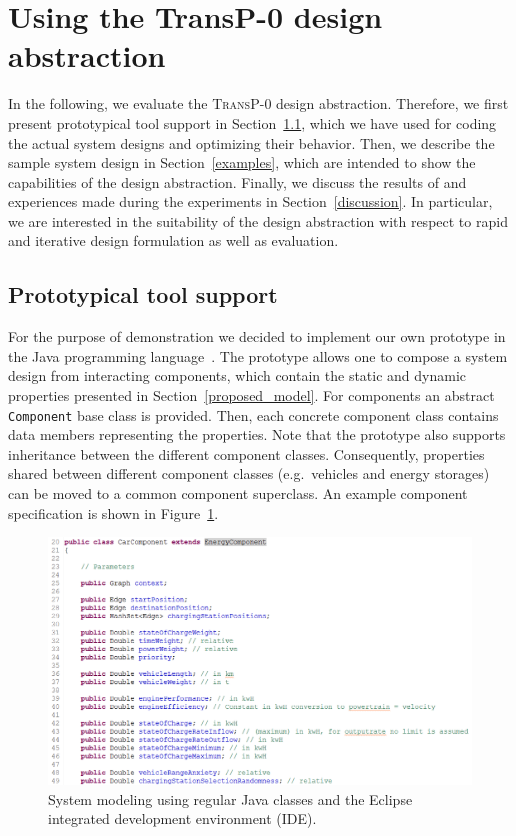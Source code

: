 \section{Using the \textbf{TransP-0} design abstraction}
\label{demonstration}

In the following, we evaluate the \textsc{TransP-0} design abstraction. Therefore, we first present prototypical tool support in Section~\ref{tool}, which we have used for coding the actual system designs and optimizing their behavior. Then, we describe the sample system design in Section~\ref{examples}, which are intended to show the capabilities of the design abstraction. Finally, we discuss the results of and experiences made during the experiments in Section~\ref{discussion}. In particular, we are interested in the suitability of the design abstraction with respect to rapid and iterative design formulation as well as evaluation.

\subsection{Prototypical tool support}
\label{tool}

For the purpose of demonstration we decided to implement our own prototype in the Java programming language~\cite{Gosling2000}. The prototype allows one to compose a system design from interacting components, which contain the static and dynamic properties presented in Section~\ref{proposed_model}. For components an abstract \texttt{Component} base class is provided. Then, each concrete component class contains data members representing the properties. Note that the prototype also supports inheritance between the different component classes. Consequently, properties shared between different component classes (e.g.\ vehicles and energy storages) can be moved to a common component superclass. An example component specification is shown in Figure~\ref{figure:modeling}.

\begin{figure}[h]
	\includegraphics[width=\columnwidth]{./gfx/modeling.png}
	\caption{System modeling using regular Java classes and the Eclipse integrated development environment (IDE).}
	\label{figure:modeling}
\end{figure}

